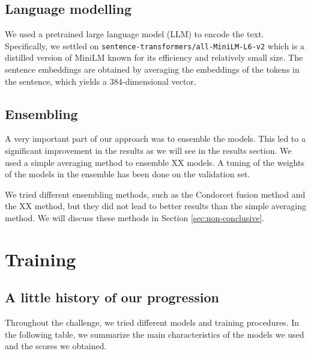 \documentclass[switch, 12pt]{article}
\begin{document}
\begin{multicols}{2}
    \subsection{Language modelling}

    We used a pretrained large language model (LLM) to encode the text. Specifically, we settled on \texttt{sentence-transformers/all-MiniLM-L6-v2} which is a distilled version of MiniLM \cite{wang-2020} known for its efficiency and relatively small size. The sentence embeddings are obtained by averaging the embeddings of the tokens in the sentence, which yields a 384-dimensional vector.

    \subsection{Ensembling}

    A very important part of our approach was to ensemble the models. This led to a significant improvement in the results as we will see in the results section. We used a simple averaging method to ensemble XX models. A tuning of the weights of the models in the ensemble has been done on the validation set.

    We tried different ensembling methods, such as the Condorcet fusion method and the XX method, but they did not lead to better results than the simple averaging method. We will discuss these methods in Section \ref{sec:non-conclusive}.


    \section{Training}

    \subsection{A little history of our progression}
    Throughout the challenge, we tried different models and training procedures. In the following table, we summarize the main characteristics of the models we used and the scores we obtained.


\end{multicols}
\end{document}
